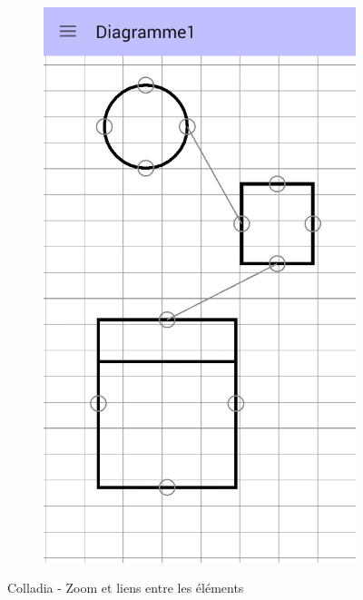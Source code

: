 \begin{itemize}
\begin{figure}[!h]
\begin{subfigure}[t]{.27\textwidth}
				\includegraphics[width=\textwidth]{img/screen/new/colladia_draw_view_element_links}
			\end{subfigure}
			\caption{Colladia - Zoom et liens entre les éléments}
		\end{figure}
\end{itemize}

\newpage
